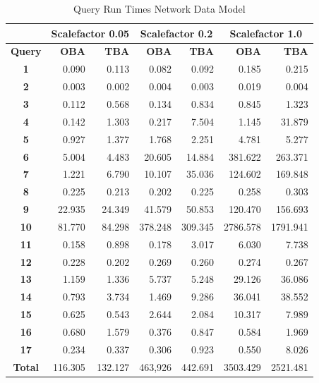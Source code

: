 \documentclass[a4paper]{article}
\begin{document}
\begin{table}
\begin{scriptsize}
\begin{center}
\begin{tabular}{|c|r|r|r|r|r|r|}
\hline
&\multicolumn{2}{c|}{\textbf{Scalefactor 0.05}}&\multicolumn{2}{c|}{\textbf{Scalefactor 0.2}}&\multicolumn{2}{c|}{\textbf{Scalefactor 1.0}}\\
\hline
\textbf{Query}&\textbf{OBA}&\textbf{TBA}&\textbf{OBA}&\textbf{TBA}&\textbf{OBA}&\textbf{TBA}\\
\hline
\textbf{1}&0.090&0.113&0.082&0.092&0.185&0.215\\
\hline
\textbf{2}&0.003&0.002&0.004&0.003&0.019&0.004\\
\hline
\textbf{3}&0.112&0.568&0.134&0.834&0.845&1.323\\
\hline
\textbf{4}&0.142&1.303&0.217&7.504&1.145&31.879\\
\hline
\textbf{5}&0.927&1.377&1.768&2.251&4.781&5.277\\
\hline
\textbf{6}&5.004&4.483&20.605&14.884&381.622&263.371\\
\hline
\textbf{7}&1.221&6.790&10.107&35.036&124.602&169.848\\
\hline
\textbf{8}&0.225&0.213&0.202&0.225&0.258&0.303\\
\hline
\textbf{9}&22.935&24.349&41.579&50.853&120.470&156.693\\
\hline
\textbf{10}&81.770&84.298&378.248&309.345&2786.578&1791.941\\
\hline
\textbf{11}&0.158&0.898&0.178&3.017&6.030&7.738\\
\hline
\textbf{12}&0.228&0.202&0.269&0.260&0.274&0.267\\
\hline
\textbf{13}&1.159&1.336&5.737&5.248&29.126&36.086\\
\hline
\textbf{14}&0.793&3.734&1.469&9.286&36.041&38.552\\
\hline
\textbf{15}&0.625&0.543&2.644&2.084&10.317&7.989\\
\hline
\textbf{16}&0.680&1.579&0.376&0.847&0.584&1.969\\
\hline
\textbf{17}&0.234&0.337&0.306&0.923&0.550&8.026\\
\hline
\textbf{Total}&116.305&132.127&463,926&442.691&3503.429&2521.481\\
\hline
\end{tabular}
\end{center}
\end{scriptsize}
\caption{Query Run Times Network Data Model}
\label{tab:rtnet}
\end{table}
\end{document}
